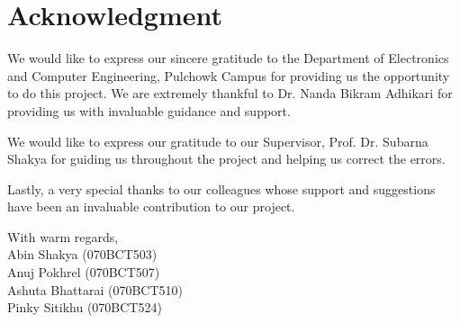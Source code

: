 

\newpage
{}
\section*{Acknowledgment}
We would like to express our sincere gratitude to the Department of Electronics and Computer
Engineering, Pulchowk Campus for providing us the opportunity to do this project. We are
extremely thankful to Dr. Nanda Bikram Adhikari  for providing us with invaluable guidance and support.

We would like to express our gratitude to our Supervisor, Prof. Dr. Subarna Shakya for guiding us throughout the project and helping us correct the errors. 

Lastly, a very special thanks to our colleagues whose support and suggestions have been an
invaluable contribution to our project.


With warm regards,\\
Abin Shakya  (070BCT503)\\
Anuj Pokhrel (070BCT507)\\
Ashuta Bhattarai (070BCT510)\\
Pinky Sitikhu (070BCT524)\\


